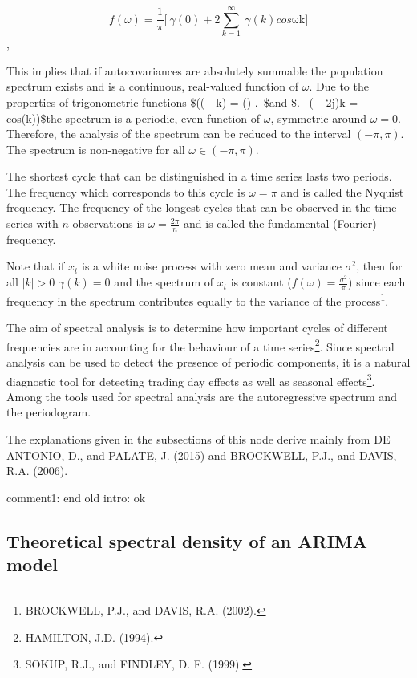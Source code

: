 \documentclass[
  letterpaper,
  DIV=11,
  numbers=noendperiod]{scrreprt}
\begin{document}
\[f(\omega) = \frac{1}{\pi}\lbrack \ \gamma(0) + 2\sum_{k = 1}^{\infty}{\ \gamma(k)}cos\text{ωk} \rbrack\],

This implies that if autocovariances are absolutely summable the
population spectrum exists and is a continuous, real-valued function of
\(\omega\). Due to the properties of trigonometric functions \$(\cos( -
\omega k) = \cos() .~\$and \$. ~\cos(\omega + 2\pi j)k =
cos(\omega k))\$the spectrum is a periodic, even function of \(\omega\),
symmetric around \(\omega = 0\). Therefore, the analysis of the spectrum
can be reduced to the interval \(( - \pi,\pi).\) The spectrum is
non-negative for all \(\omega \in ( - \pi,\pi)\).

The shortest cycle that can be distinguished in a time series lasts two
periods. The frequency which corresponds to this cycle is
\(\omega = \pi\) and is called the Nyquist frequency. The frequency of
the longest cycles that can be observed in the time series with \(n\)
observations is \(\omega = \frac{2\pi}{n}\) and is called the
fundamental (Fourier) frequency.

Note that if \(x_{t}\) is a white noise process with zero mean and
variance \(\sigma^{2}\), then for all \(|k|> 0\) \(\gamma(k)=0\) and the
spectrum of \(x_{t}\) is constant
(\(f(\omega)= \frac{\sigma^{2}}{\pi}\)) since each frequency in the
spectrum contributes equally to the variance of the process\footnote{BROCKWELL,
  P.J., and DAVIS, R.A. (2002).}.

The aim of spectral analysis is to determine how important cycles of
different frequencies are in accounting for the behaviour of a time
series\footnote{HAMILTON, J.D. (1994).}. Since spectral analysis can be
used to detect the presence of periodic components, it is a natural
diagnostic tool for detecting trading day effects as well as seasonal
effects\footnote{SOKUP, R.J., and FINDLEY, D. F. (1999).}. Among the
tools used for spectral analysis are the autoregressive spectrum and the
periodogram.

The explanations given in the subsections of this node derive mainly
from DE ANTONIO, D., and PALATE, J. (2015) and BROCKWELL, P.J., and
DAVIS, R.A. (2006).

comment1: end old intro: ok

\hypertarget{theoretical-spectral-density-of-an-arima-model}{%
\subsection{Theoretical spectral density of an ARIMA
model}\label{theoretical-spectral-density-of-an-arima-model}}
\end{document}
